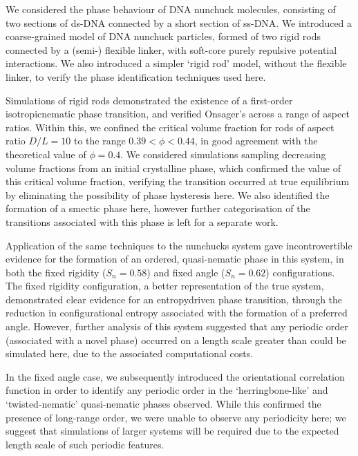 \documentclass[11pt, a4paper]{article} %
\begin{document}
We considered the phase behaviour of DNA nunchuck molecules, consisting of two sections of ds-DNA connected by a short section of ss-DNA. We introduced a coarse-grained model of DNA nunchuck particles, formed of two rigid rods connected by a (semi-) flexible linker, with soft-core purely repulsive potential interactions. We also introduced a simpler `rigid rod' model, without the flexible linker, to verify the phase identification techniques used here.

Simulations of rigid rods demonstrated the existence of a first-order isotropic\textendash nematic phase transition, and verified Onsager's across a range of aspect ratios. Within this, we confined the critical volume fraction for rods of aspect ratio $D/L = 10$ to the range $0.39<\phi<0.44$, in good agreement with the theoretical value of $\phi = 0.4$. We considered simulations sampling decreasing volume fractions from an initial crystalline phase, which confirmed the value of this critical volume fraction, verifying the transition occurred at true equilibrium by eliminating the possibility of phase hysteresis here. We also identified the formation of a smectic phase here, however further categorisation of the transitions associated with this phase is left for a separate work.

Application of the same techniques to the nunchucks system gave incontrovertible evidence for the formation of an ordered, quasi-nematic phase in this system, in both the fixed rigidity ($S_{n} = 0.58$) and fixed angle ($S_{n} = 0.62$) configurations. The fixed rigidity configuration, a better representation of the true system, demonstrated clear evidence for an entropy\textendash driven phase transition, through the reduction in configurational entropy associated with the formation of a preferred angle. However, further analysis of this system suggested that any periodic order (associated with a novel phase) occurred on a length scale greater than could be simulated here, due to the associated computational costs.

In the fixed angle case, we subsequently introduced the orientational correlation function in order to identify any periodic order in the `herringbone-like' and `twisted-nematic' quasi-nematic phases observed. While this confirmed the presence of long-range order, we were unable to observe any periodicity here; we suggest that simulations of larger systems will be required due to the expected length scale of such periodic features.
\end{document}
